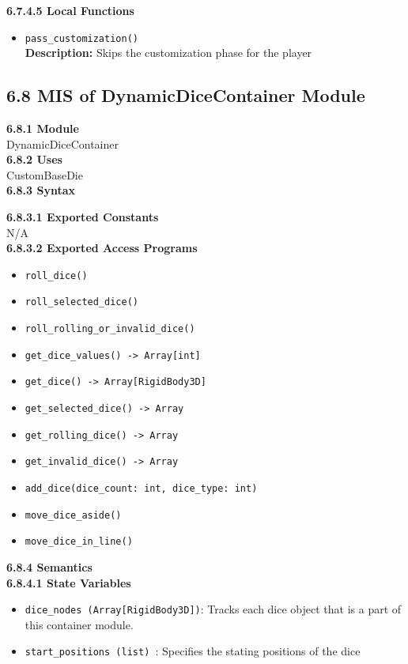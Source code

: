 \documentclass[12pt, titlepage]{article}
\begin{document}
\textbf{6.7.4.5 Local Functions}

\begin{itemize}
    \item \texttt{pass\_customization()}\\
    	\textbf{Description:} Skips the customization phase for the player
\end{itemize}


\subsection*{6.8 MIS of DynamicDiceContainer Module}
\textbf{6.8.1 Module}\\
 DynamicDiceContainer\\

\noindent \textbf{6.8.2 Uses}\\
CustomBaseDie \\

\noindent \textbf{6.8.3 Syntax}

\noindent \textbf{6.8.3.1 Exported Constants}\\
N/A\\

\textbf{6.8.3.2 Exported Access Programs}
\begin{itemize}
	\item \texttt{roll\_dice() }
	\item \texttt{roll\_selected\_dice() }
	\item \texttt{roll\_rolling\_or\_invalid\_dice() }
	\item \texttt{get\_dice\_values() -> Array[int] }
	\item \texttt{get\_dice() -> Array[RigidBody3D]  }
	\item \texttt{get\_selected\_dice() -> Array }
	\item \texttt{get\_rolling\_dice() -> Array }
	\item \texttt{get\_invalid\_dice() -> Array  }
	\item \texttt{add\_dice(dice\_count: int, dice\_type: int)}
	\item \texttt{move\_dice\_aside() }
	\item \texttt{move\_dice\_in\_line() }
	
\end{itemize}

\noindent \textbf{6.8.4 Semantics}\\
\textbf{6.8.4.1 State Variables}\\
\begin{itemize}
	\item \texttt{dice\_nodes (Array[RigidBody3D])}: Tracks each dice object that is a part of this container module.
	\item \texttt{start\_positions (list) }: Specifies the stating positions of the dice

\end{itemize}
\end{document}

